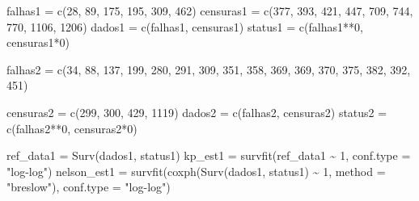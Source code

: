 \documentclass[
]{article}
\newenvironment{Shaded}{\begin{snugshade}}{\end{snugshade}}
\newcommand{\AttributeTok}[1]{\textcolor[rgb]{0.77,0.63,0.00}{#1}}
\newcommand{\DecValTok}[1]{\textcolor[rgb]{0.00,0.00,0.81}{#1}}
\newcommand{\FunctionTok}[1]{\textcolor[rgb]{0.00,0.00,0.00}{#1}}
\newcommand{\NormalTok}[1]{#1}
\newcommand{\OtherTok}[1]{\textcolor[rgb]{0.56,0.35,0.01}{#1}}
\newcommand{\SpecialCharTok}[1]{\textcolor[rgb]{0.00,0.00,0.00}{#1}}
\newcommand{\StringTok}[1]{\textcolor[rgb]{0.31,0.60,0.02}{#1}}
\begin{document}
\begin{Shaded}
\begin{Highlighting}[]
\NormalTok{falhas1   }\OtherTok{=} \FunctionTok{c}\NormalTok{(}\DecValTok{28}\NormalTok{, }\DecValTok{89}\NormalTok{, }\DecValTok{175}\NormalTok{, }\DecValTok{195}\NormalTok{, }\DecValTok{309}\NormalTok{, }\DecValTok{462}\NormalTok{)}
\NormalTok{censuras1 }\OtherTok{=} \FunctionTok{c}\NormalTok{(}\DecValTok{377}\NormalTok{, }\DecValTok{393}\NormalTok{, }\DecValTok{421}\NormalTok{, }\DecValTok{447}\NormalTok{, }\DecValTok{709}\NormalTok{, }\DecValTok{744}\NormalTok{, }\DecValTok{770}\NormalTok{, }\DecValTok{1106}\NormalTok{, }\DecValTok{1206}\NormalTok{)}
\NormalTok{dados1    }\OtherTok{=} \FunctionTok{c}\NormalTok{(falhas1,    censuras1)}
\NormalTok{status1   }\OtherTok{=} \FunctionTok{c}\NormalTok{(falhas1}\SpecialCharTok{**}\DecValTok{0}\NormalTok{, censuras1}\SpecialCharTok{*}\DecValTok{0}\NormalTok{)}

\NormalTok{falhas2   }\OtherTok{=} \FunctionTok{c}\NormalTok{(}\DecValTok{34}\NormalTok{, }\DecValTok{88}\NormalTok{, }\DecValTok{137}\NormalTok{, }\DecValTok{199}\NormalTok{, }\DecValTok{280}\NormalTok{,}
              \DecValTok{291}\NormalTok{, }\DecValTok{309}\NormalTok{, }\DecValTok{351}\NormalTok{, }\DecValTok{358}\NormalTok{, }\DecValTok{369}\NormalTok{,}
              \DecValTok{369}\NormalTok{, }\DecValTok{370}\NormalTok{, }\DecValTok{375}\NormalTok{, }\DecValTok{382}\NormalTok{, }\DecValTok{392}\NormalTok{,}
              \DecValTok{451}\NormalTok{)}

\NormalTok{censuras2 }\OtherTok{=} \FunctionTok{c}\NormalTok{(}\DecValTok{299}\NormalTok{, }\DecValTok{300}\NormalTok{, }\DecValTok{429}\NormalTok{, }\DecValTok{1119}\NormalTok{)}
\NormalTok{dados2    }\OtherTok{=} \FunctionTok{c}\NormalTok{(falhas2,    censuras2)}
\NormalTok{status2   }\OtherTok{=} \FunctionTok{c}\NormalTok{(falhas2}\SpecialCharTok{**}\DecValTok{0}\NormalTok{, censuras2}\SpecialCharTok{*}\DecValTok{0}\NormalTok{)}

\NormalTok{ref\_data1   }\OtherTok{=} \FunctionTok{Surv}\NormalTok{(dados1, status1)}
\NormalTok{kp\_est1     }\OtherTok{=} \FunctionTok{survfit}\NormalTok{(ref\_data1 }\SpecialCharTok{\textasciitilde{}} \DecValTok{1}\NormalTok{, }\AttributeTok{conf.type =} \StringTok{"log{-}log"}\NormalTok{)}
\NormalTok{nelson\_est1 }\OtherTok{=} \FunctionTok{survfit}\NormalTok{(}\FunctionTok{coxph}\NormalTok{(}\FunctionTok{Surv}\NormalTok{(dados1, status1) }\SpecialCharTok{\textasciitilde{}} \DecValTok{1}\NormalTok{,}
                            \AttributeTok{method =} \StringTok{"breslow"}\NormalTok{),}
                      \AttributeTok{conf.type =} \StringTok{"log{-}log"}\NormalTok{)}


\end{Highlighting}
\end{Shaded}
\end{document}
